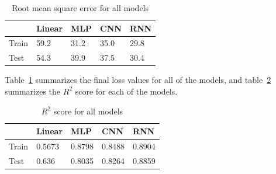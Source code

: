 \begin{table}
\caption{Root mean square error for all models}
\label{loss_table}
\begin{center}
\begin{tabular}{|l|l|l|l|l|}\hline
      & Linear & MLP & CNN & RNN \\\hline
Train & 59.2 & 31.2 & 35.0 & 29.8 \\\hline
Test  & 54.3 & 39.9 & 37.5 & 30.4 \\\hline
\end{tabular}
\end{center}
\end{table}

Table~\ref{loss_table} summarizes the final loss values for all of the models, and table~\ref{r2_table} summarizes the $R^2$ score for each of the models.

\begin{table}
\caption{$R^2$ score for all models}
\label{r2_table}
\begin{center}
\begin{tabular}{|l|l|l|l|l|}\hline
      & Linear & MLP    & CNN   & RNN   \\\hline
Train & 0.5673 & 0.8798 & 0.8488 & 0.8904 \\\hline
Test  & 0.636  & 0.8035 & 0.8264 & 0.8859 \\\hline
\end{tabular}
\end{center}
\end{table}
